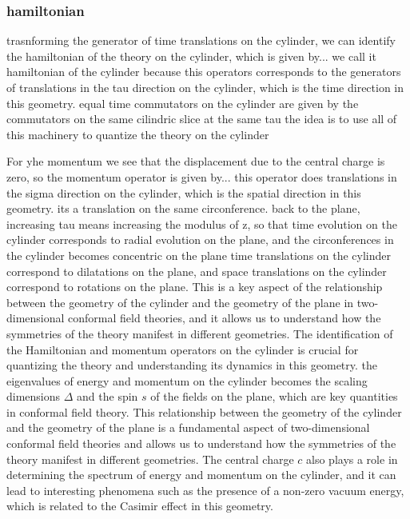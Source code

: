 \subsubsection{hamiltonian}

trasnforming the generator of time translations on the cylinder, we can identify the hamiltonian of the theory on the cylinder, which is given by...
we call it hamiltonian of the cylinder because this operators corresponds to the generators of translations in the tau direction on the cylinder, which is the time direction in this geometry. equal time commutators on the cylinder are given by the commutators on the same cilindric slice at the same tau
the idea is to use all of this machinery to quantize the theory on the cylinder

For yhe momentum we see that the displacement due to the central charge is zero, so the momentum operator is given by...
this operator does translations in the sigma direction on the cylinder, which is the spatial direction in this geometry. its a translation on the same circonference.
back to the plane, increasing tau means increasing the modulus of z, so that time evolution on the cylinder corresponds to radial evolution on the plane, and the circonferences in the cylinder becomes concentric on the plane
time translations on the cylinder correspond to dilatations on the plane, and space translations on the cylinder correspond to rotations on the plane. This is a key aspect of the relationship between the geometry of the cylinder and the geometry of the plane in two-dimensional conformal field theories, and it allows us to understand how the symmetries of the theory manifest in different geometries. The identification of the Hamiltonian and momentum operators on the cylinder is crucial for quantizing the theory and understanding its dynamics in this geometry.
the eigenvalues of energy and momentum on the cylinder becomes the scaling dimensions \(\Delta\) and the spin \(s\) of the fields on the plane, which are key quantities in conformal field theory. This relationship between the geometry of the cylinder and the geometry of the plane is a fundamental aspect of two-dimensional conformal field theories and allows us to understand how the symmetries of the theory manifest in different geometries. The central charge \(c\) also plays a role in determining the spectrum of energy and momentum on the cylinder, and it can lead to interesting phenomena such as the presence of a non-zero vacuum energy, which is related to the Casimir effect in this geometry.

